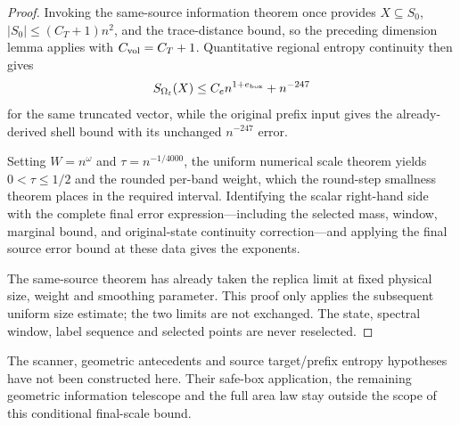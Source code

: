 \begin{proof}
    \leanok
    Invoking the same-source information theorem once provides
    $X\subseteq S_0$, $|S_0|\leq(C_T+1)n^2$, and the trace-distance bound,
    so the preceding dimension lemma applies with $C_{\rm vol}=C_T+1$.
    Quantitative regional entropy continuity then gives
    \[
        S_{\Omega_t}(X)\leq C_e n^{1+e_{\rm box}}+n^{-247}
    \]
    for the same truncated vector, while the original prefix input gives
    the already-derived shell bound with its unchanged $n^{-247}$ error.

    Setting $W=n^\omega$ and $\tau=n^{-1/4000}$, the uniform numerical scale
    theorem yields $0<\tau\leq1/2$ and the rounded per-band weight, which
    the round-step smallness theorem places in the required interval.
    Identifying the scalar right-hand side with the complete final error
    expression---including the selected mass, window, marginal bound, and
    original-state continuity correction---and applying the final source error
    bound at these data gives the exponents.

    The same-source theorem has already taken the replica limit at fixed
    physical size, weight and smoothing parameter.  This proof only applies
    the subsequent uniform size estimate; the two limits are not exchanged.
    The state, spectral window, label sequence and selected points are never
    reselected.
\end{proof}

The scanner, geometric antecedents and source target/prefix entropy
hypotheses have not been constructed here.  Their safe-box application,
the remaining geometric information telescope and the full area law stay
outside the scope of this conditional final-scale bound.
